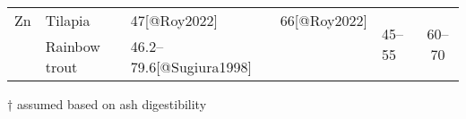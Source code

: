 \begin{table}
\begin{threeparttable}
\begin{tabularx}{\textwidth}{XlXXXc}
    \addlinespace
    
    Zn
    & Tilapia
    & \SI{47}{\p}\tnote{†}[@Roy2022]
    & \SI{66}{\p}[@Roy2022]
    & \multirow{2}{*}{\SIrange{45}{55}{\p}}
    & \multirow{2}{*}{\SIrange{60}{70}{\p}}
    \\
    
    
    & Rainbow trout
    & \SIrange{46.2}{79.6}{\p}[@Sugiura1998]
    &
    &
    &
    \\
    
    \bottomrule

    \end{tabularx}
    \begin{tablenotes}
      \item[†] assumed based on ash digestibility
    \end{tablenotes}
  \end{threeparttable}
\end{table}
